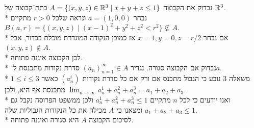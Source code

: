 \Subquestion{}
נבדוק את הקבוצה $A = \{ (x, y, z) \in \mathbb{R}^3 \mid x + y + z \le 1\}$ כתת־קבוצה של $\mathbb{R}^3$. \\*
נבחר $a = (1, 0, 0)$ ונראה שלכל $r > 0$ מתקיים $B(a, r) = \{(x, y, z) \mid {(x - 1)}^2 + y^2 + z^2 < r^2 \} \not\subseteq A$. \\*
אם נבחר $x = 1, y = 0, z = r / 2$ אז כמובן הנקודה המוגדרת מוכלת בכדור, אבל $(x, y, z) \not\in A$. \\*
לכן הקבוצה איננה פתוחה. \\*
נבדוק אם הקבוצה סגורה. נגדיר ${(a_n)}_{n = 1}^\infty \in A$ סדרת נקודות מתכנסת ל־$a$. \\*
משאלה 3 נובע כי הגבול מתכנס אם ורק אם כל סדרת נקודות $(a_n^i)$ כאשר $1 \le i \le 3$ מתכנסת אף היא, ולכן $\lim_{n \to \infty} a_n^1 + a_n^2 + a_n^3 = a_1 + a_2 + a_3$. \\*
ואנו יודעים כי לכל $n$ מתקיים $a_n^1 + a_n^2 + a_n^3 \le 1$ ולכן ממשפט הפרוסה נקבל גם $a_1 + a_2 + a_3 \le 1$ ומצאנו כי $A$ מכילה את כל הנקודות הגבוליות שלה. \\*
לסיכום הקבוצה $A$ היא סגורה ואיננה פתוחה.


